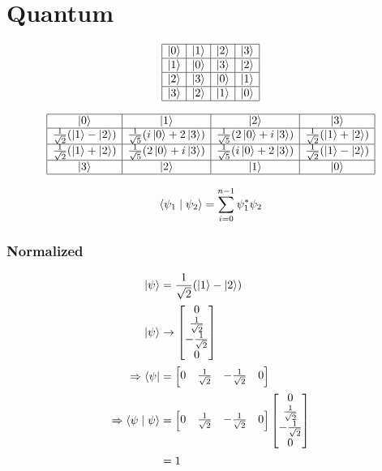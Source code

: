 \chapter{Quantum}


$$
\begin{array}{|c|c|c|c|}
  \hline
  \ket{0} & \ket{1} & \ket{2} & \ket{3} \\
  \hline
  \ket{1} & \ket{0} & \ket{3} & \ket{2} \\
  \hline
  \ket{2} & \ket{3} & \ket{0} & \ket{1} \\
  \hline
  \ket{3} & \ket{2} & \ket{1} & \ket{0} \\
  \hline
\end{array}
$$


$$
\begin{array}{|c|c|c|c|}
  \hline
  \ket{0} & \ket{1} & \ket{2} & \ket{3} \\
  \hline
  \frac{1}{\sqrt{2}}(\ket{1}-\ket{2}) & \frac{1}{\sqrt{5}}(i\ket{0}+2\ket{3}) & \frac{1}{\sqrt{5}}(2\ket{0}+i\ket{3}) & \frac{1}{\sqrt{2}}(\ket{1}+\ket{2}) \\
  \hline
  \frac{1}{\sqrt{2}}(\ket{1}+\ket{2}) & \frac{1}{\sqrt{5}}(2\ket{0}+i\ket{3}) & \frac{1}{\sqrt{5}}(i\ket{0}+2\ket{3}) & \frac{1}{\sqrt{2}}(\ket{1}-\ket{2}) \\
  \hline
  \ket{3} & \ket{2} & \ket{1} & \ket{0} \\
  \hline
\end{array}
$$ 


$$
\braket{\psi_1 \mid \psi_2} = \sum_{i=0}^{n-1} \psi_1^* \psi_2
$$

\subsection{Normalized}

\begin{align}
\ket{\psi} &= \frac{1}{\sqrt{2}}(\ket{1}-\ket{2}) \\
\ket{\psi} &\rightarrow \begin{bmatrix} 0 \\ \frac{1}{\sqrt{2}} \\ -\frac{1}{\sqrt{2}} \\ 0 \end{bmatrix} \\
\Rightarrow \bra{\psi} &= \begin{bmatrix} 0 & \frac{1}{\sqrt{2}} & -\frac{1}{\sqrt{2}} & 0 \end{bmatrix} \\
\Rightarrow \braket{\psi \mid \psi} &= \begin{bmatrix} 0 & \frac{1}{\sqrt{2}} & -\frac{1}{\sqrt{2}} & 0 \end{bmatrix} \begin{bmatrix} 0 \\ \frac{1}{\sqrt{2}} \\ -\frac{1}{\sqrt{2}} \\ 0 \end{bmatrix} \\
&= 1
\end{align}



